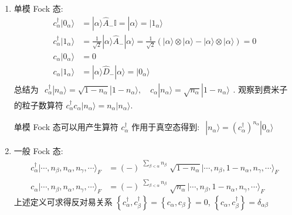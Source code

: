 \documentclass[../../main.tex]{subfiles}
\begin{document}
\begin{enumerate}
  \item 单模 Fock 态:
  \begin{align*}
    c_{\alpha}^{\dagger}|0_{\alpha}\rangle &= |\alpha\rangle\hat{A}_{-}\mathbb{I} = |\alpha\rangle = |1_{\alpha}\rangle\\
    c_{\alpha}^{\dagger}|1_{\alpha}\rangle &= \frac{1}{\sqrt{2}}|\alpha\rangle\hat{A}_{-}|\alpha\rangle = \frac{1}{\sqrt{2}}(|\alpha\rangle\otimes|\alpha\rangle - |\alpha\rangle\otimes|\alpha\rangle) = 0\\
    c_{\alpha}|0_{\alpha}\rangle & = 0\\
    c_{\alpha}|1_{\alpha}\rangle &= |\alpha\rangle\hat{D}_{-}|\alpha\rangle = |0_{\alpha}\rangle
  \end{align*}
  总结为 $\begin{aligned}
    c_{\alpha}^{\dagger}|n_{\alpha}\rangle = \sqrt{1-n_{\alpha}}|1-n_{\alpha}\rangle,\quad c_{\alpha}|n_{\alpha}\rangle = \sqrt{n_{\alpha}}|1 - n_{\alpha}\rangle
  \end{aligned}$. 观察到费米子的粒子数算符 $c_{\alpha}^{\dagger}c_{\alpha}|n_{\alpha}\rangle = n_{\alpha}|n_{\alpha}\rangle$.

  单模 Fock 态可以用产生算符 $c_{\alpha}^{\dagger}$ 作用于真空态得到: $\begin{aligned}
    |n_{\alpha}\rangle = \left(c_{\alpha}^{\dagger}\right)^{n_{\alpha}}|0_{\alpha}\rangle
  \end{aligned}$
  \item 一般 Fock 态:
  \begin{align*}
    c_{\alpha}^{\dagger} |\cdots,n_{\beta},n_{\alpha},n_{\gamma},\cdots\rangle_{F} &= (-)^{\begin{aligned}
      \sum_{\beta<\alpha}n_{\beta}
    \end{aligned}}\sqrt{1-n_{\alpha}}|\cdots,n_{\beta},1-n_{\alpha},n_{\gamma},\cdots\rangle_{F}\\
    c_{\alpha}|\cdots,n_{\beta},n_{\alpha},n_{\gamma},\cdots\rangle_{F} &= (-)^{\begin{aligned}
      \sum_{\beta<\alpha}n_{\beta}
    \end{aligned}}\sqrt{n_{\alpha}}|\cdots,n_{\beta},1-n_{\alpha},n_{\gamma},\cdots\rangle_{F}
  \end{align*}
  上述定义可求得反对易关系 $\left\{c_{\alpha}^{\dagger},c_{\beta}^{\dagger}\right\} = \left\{c_{\alpha},c_{\beta}\right\} = 0$, $\left\{c_{\alpha},c_{\beta}^{\dagger}\right\}=\delta_{\alpha\beta}$
\end{enumerate}
\end{document}
